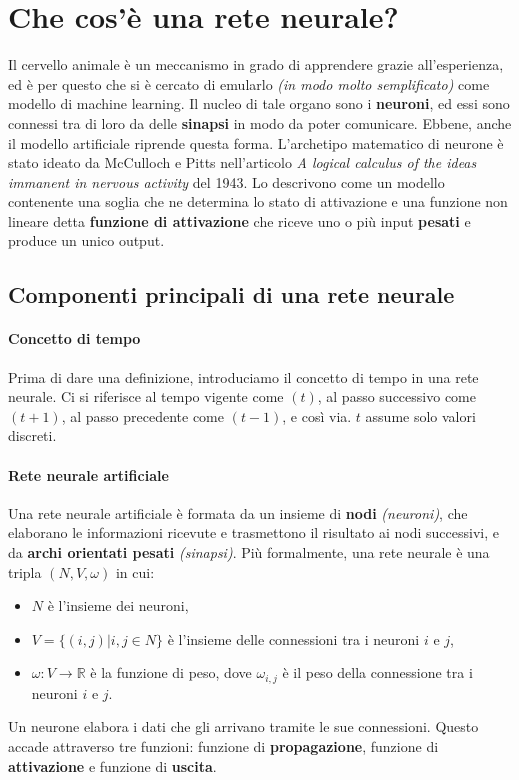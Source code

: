 \documentclass[12pt, twoside, letterpaper]{report}
\begin{document}
		\section{Che cos'è una rete neurale?}
			Il cervello animale è un meccanismo in grado di apprendere grazie all'esperienza, ed è per questo che si è cercato di emularlo \textit{(in modo molto semplificato)} come modello di machine learning. Il nucleo di tale organo sono i \textbf{neuroni}, ed essi sono connessi tra di loro da delle \textbf{sinapsi} in modo da poter comunicare. Ebbene, anche il modello artificiale riprende questa forma. L'archetipo matematico di neurone è stato ideato da McCulloch e Pitts nell'articolo \textit{A logical calculus of the ideas immanent in nervous activity} del 1943. Lo descrivono come un modello contenente una soglia che ne determina lo stato di attivazione e una funzione non lineare detta \textbf{funzione di attivazione} che riceve uno o più input \textbf{pesati} e produce un unico output.
			
		\subsection{Componenti principali di una rete neurale} 
			\paragraph{Concetto di tempo} Prima di dare una definizione, introduciamo il concetto di tempo in una rete neurale. Ci si riferisce al tempo vigente come $(t)$, al passo successivo come $(t+1)$, al passo precedente come $(t-1)$, e così via. $t$ assume solo valori discreti.
			
			\paragraph{Rete neurale artificiale} Una rete neurale artificiale è formata da un insieme di \textbf{nodi} \textit{(neuroni)}, che elaborano le informazioni ricevute e trasmettono il risultato ai nodi successivi, e da \textbf{archi orientati pesati} \textit{(sinapsi)}. Più formalmente, una rete neurale è una tripla $(N,V, \omega)$ in cui:
			\begin{itemize}
				\item $N$ è l'insieme dei neuroni,
				\item $V = \{(i,j) | i,j \in N\}$ è l'insieme delle connessioni tra i neuroni $i$ e $j$, 
				\item $\omega: V \rightarrow \mathbb{R}$ è la funzione di peso, dove $\omega_{i,j}$ è il peso della connessione tra i neuroni $i$ e $j$.  
			\end{itemize}
			Un neurone elabora i dati che gli arrivano tramite le sue connessioni. Questo accade attraverso tre funzioni: funzione di \textbf{propagazione}, funzione di \textbf{attivazione} e funzione di \textbf{uscita}.
			
\end{document}
